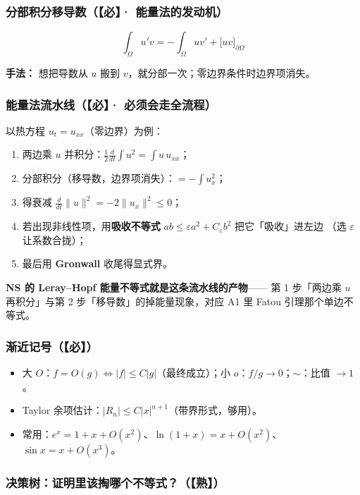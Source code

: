 \subsubsection{分部积分移导数（【必】· 能量法的发动机）}

\[
\int_\Omega u'v=-\int_\Omega uv'+\big[uv\big]_{\partial\Omega}
\]

\textbf{手法：} 想把导数从 $u$ 搬到 $v$，就分部一次；零边界条件时边界项消失。

\subsubsection{能量法流水线（【必】· 必须会走全流程）}

以热方程 $u_t=u_{xx}$（零边界）为例：

\begin{enumerate}
  \item 两边乘 $u$ 并积分：$\frac12\frac{d}{dt}\int u^2=\int u\,u_{xx}$；
  \item 分部积分（移导数，边界项消失）：$=-\int u_x^2$；
  \item 得衰减 $\frac{d}{dt}\|u\|^2=-2\|u_x\|^2\le0$；
  \item 若出现非线性项，用\textbf{吸收不等式} $ab\le\varepsilon a^2+C_\varepsilon b^2$ 把它「吸收」进左边
        （选 $\varepsilon$ 让系数合拢）；
  \item 最后用 \textbf{Gronwall} 收尾得显式界。
\end{enumerate}

\textbf{NS 的 Leray--Hopf 能量不等式就是这条流水线的产物}——
第 1 步「两边乘 $u$ 再积分」与第 2 步「移导数」的掉能量现象，对应 A1 里 Fatou 引理那个单边不等式。

\subsubsection{渐近记号（【必】）}

\begin{itemize}
  \item 大 $O$：$f=O(g)\iff|f|\le C|g|$（最终成立）；小 $o$：$f/g\to0$；$\sim$：比值 $\to1$。
  \item Taylor 余项估计：$|R_n|\le C|x|^{n+1}$（带界形式，够用）。
  \item 常用：$e^x=1+x+O(x^2)$、$\ln(1+x)=x+O(x^2)$、$\sin x=x+O(x^3)$。
\end{itemize}

\subsubsection{决策树：证明里该掏哪个不等式？（【熟】）}

